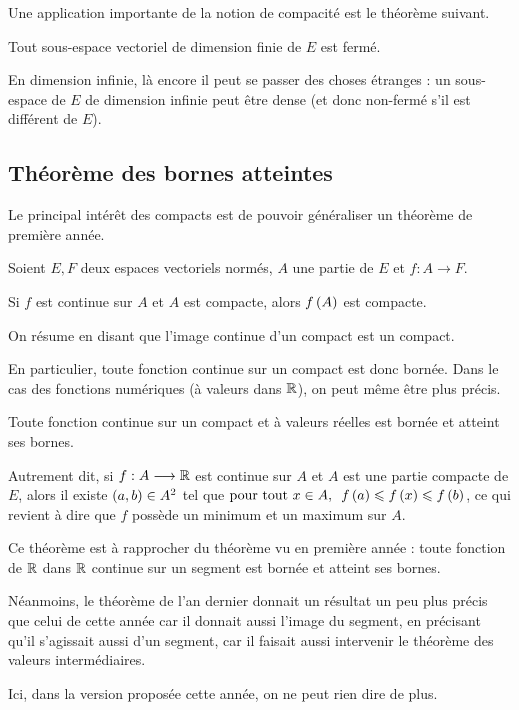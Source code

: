 Une application importante de la notion de compacité est le théorème suivant.

\begin{theo}
Tout sous-espace vectoriel de dimension finie de \(E\) est fermé.
\end{theo}

En dimension infinie, là encore il peut se passer des choses étranges : un sous-espace de \(E\) de dimension infinie peut être dense (et donc non-fermé s'il est différent de \(E\)).

\subsection{Théorème des bornes atteintes}

Le principal intérêt des compacts est de pouvoir généraliser un théorème de première année.

\begin{theo}
Soient \(E,F\) deux espaces vectoriels normés, \(A\) une partie de \(E\) et \(f:A\to F\).

Si \(f\) est continue sur \(A\) et \(A\) est compacte, alors \(f\left(A\right)\) est compacte.
\end{theo}

On résume en disant que l'image continue d'un compact est un compact.

En particulier, toute fonction continue sur un compact est donc bornée. Dans le cas des fonctions numériques (\ie à valeurs dans \(\mathbb{R}\)), on peut même être plus précis.

\begin{theo}
Toute fonction continue sur un compact et à valeurs réelles est bornée et atteint ses bornes.

Autrement dit, si \(f:A\longrightarrow\mathbb{R}\) est continue sur \(A\) et \(A\) est une partie compacte de \(E\), alors il existe \(\left(a,b\right)\in A^2\) tel que \(\quantifs{\tpt x\in A}f\paren{a}\leq f\paren{x}\leq f\paren{b}\), ce qui revient à dire que \(f\) possède un minimum et un maximum sur \(A\).
\end{theo}

\begin{rem}
Ce théorème est à rapprocher du théorème vu en première année : toute fonction de \(\mathbb{R}\) dans \(\mathbb{R}\) continue sur un segment est bornée et atteint ses bornes.

Néanmoins, le théorème de l'an dernier donnait un résultat un peu plus précis que celui de cette année car il donnait aussi l'image du segment, en précisant qu'il s'agissait aussi d'un segment, car il faisait aussi intervenir le théorème des valeurs intermédiaires.

Ici, dans la version proposée cette année, on ne peut rien dire de plus.
\end{rem}

